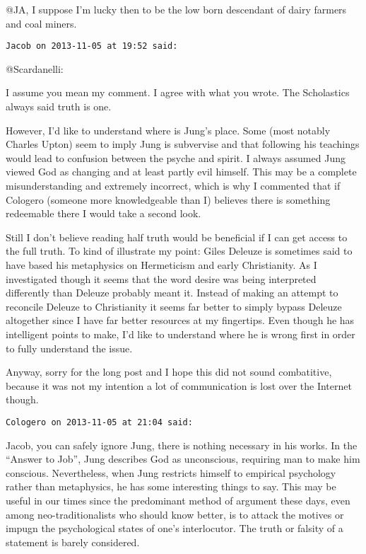 \begin{footnotesize}
\begin{sffamily}
@JA, I suppose I'm lucky then to be the low born descendant of dairy farmers and coal miners.


\hfill

\texttt{Jacob on 2013-11-05 at 19:52 said: }

@Scardanelli: 

I assume you mean my comment. I agree with what you wrote. The Scholastics always said truth is one. 

However, I'd like to understand where is Jung's place. Some (most notably Charles Upton) seem to imply Jung is subvervise and that following his teachings would lead to confusion between the psyche and spirit. I always assumed Jung viewed God as changing and at least partly evil himself. This may be a complete misunderstanding and extremely incorrect, which is why I commented that if Cologero (someone more knowledgeable than I) believes there is something redeemable there I would take a second look. 

Still I don't believe reading half truth would be beneficial if I can get access to the full truth. To kind of illustrate my point: Giles Deleuze is sometimes said to have based his metaphysics on Hermeticism and early Christianity. As I investigated though it seems that the word desire was being interpreted differently than Deleuze probably meant it. Instead of making an attempt to reconcile Deleuze to Christianity it seems far better to simply bypass Deleuze altogether since I have far better resources at my fingertips. Even though he has intelligent points to make, I'd like to understand where he is wrong first in order to fully understand the issue. 

Anyway, sorry for the long post and I hope this did not sound combatitive, because it was not my intention a lot of communication is lost over the Internet though.


\hfill

\texttt{Cologero on 2013-11-05 at 21:04 said: }

Jacob, you can safely ignore Jung, there is nothing necessary in his works. In the “Answer to Job”, Jung describes God as unconscious, requiring man to make him conscious. Nevertheless, when Jung restricts himself to empirical psychology rather than metaphysics, he has some interesting things to say. This may be useful in our times since the predominant method of argument these days, even among neo-traditionalists who should know better, is to attack the motives or impugn the psychological states of one's interlocutor. The truth or falsity of a statement is barely considered.


\end{sffamily}
\end{footnotesize}
